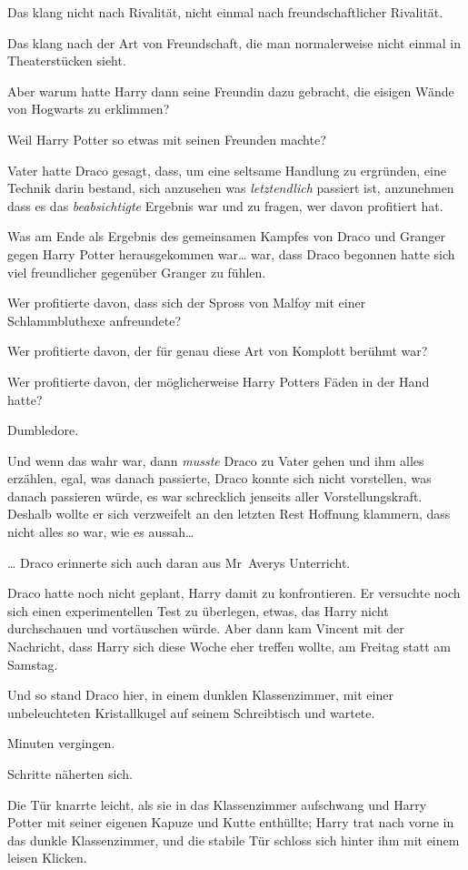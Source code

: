 {Das klang nicht nach Rivalität, nicht einmal nach freundschaftlicher Rivalität.

Das klang nach der Art von Freundschaft, die man normalerweise nicht einmal in Theaterstücken sieht.

Aber warum hatte Harry dann seine Freundin dazu gebracht, die eisigen Wände von Hogwarts zu erklimmen?

Weil Harry Potter so etwas mit seinen Freunden machte?

Vater hatte Draco gesagt, dass, um eine seltsame Handlung zu ergründen, eine Technik darin bestand, sich anzusehen was \emph{letztendlich} passiert ist, anzunehmen dass es das \emph{beabsichtigte} Ergebnis war und zu fragen, wer davon profitiert hat.

Was am Ende als Ergebnis des gemeinsamen Kampfes von Draco und Granger gegen Harry Potter herausgekommen war… war, dass Draco begonnen hatte sich viel freundlicher gegenüber Granger zu fühlen.

Wer profitierte davon, dass sich der Spross von Malfoy mit einer Schlammbluthexe anfreundete?

Wer profitierte davon, der für genau diese Art von Komplott berühmt war?

Wer profitierte davon, der möglicherweise Harry Potters Fäden in der Hand hatte?

Dumbledore.

Und wenn das wahr war, dann \emph{musste} Draco zu Vater gehen und ihm alles erzählen, egal, was danach passierte, Draco konnte sich nicht vorstellen, was danach passieren würde, es war schrecklich jenseits aller Vorstellungskraft. Deshalb wollte er sich verzweifelt an den letzten Rest Hoffnung klammern, dass nicht alles so war, wie es aussah…

… Draco erinnerte sich auch daran aus Mr~Averys Unterricht.

Draco hatte noch nicht geplant, Harry damit zu konfrontieren. Er versuchte noch sich einen experimentellen Test zu überlegen, etwas, das Harry nicht durchschauen und vortäuschen würde. Aber dann kam Vincent mit der Nachricht, dass Harry sich diese Woche eher treffen wollte, am Freitag statt am Samstag.

Und so stand Draco hier, in einem dunklen Klassenzimmer, mit einer unbeleuchteten Kristallkugel auf seinem Schreibtisch und wartete.

Minuten vergingen.

Schritte näherten sich.

Die Tür knarrte leicht, als sie in das Klassenzimmer aufschwang und Harry Potter mit seiner eigenen Kapuze und Kutte enthüllte; Harry trat nach vorne in das dunkle Klassenzimmer, und die stabile Tür schloss sich hinter ihm mit einem leisen Klicken.

}
